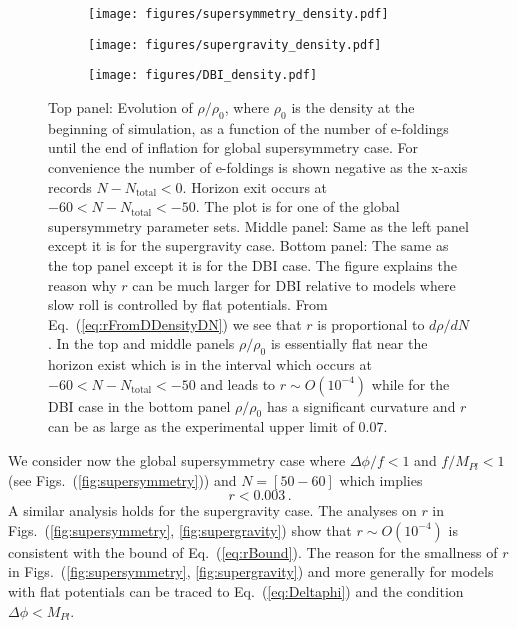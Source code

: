 \documentclass[12pt]{article}
\begin{document}
\begin{figure}
  \centering
  \begin{subfigure}{0.5 \textwidth}
    \texttt{[image: figures/supersymmetry\_density.pdf]}
  \end{subfigure}
  \begin{subfigure}{0.5 \textwidth}
    \texttt{[image: figures/supergravity\_density.pdf]}
  \end{subfigure}
  \begin{subfigure}{0.5 \textwidth}
    \texttt{[image: figures/DBI\_density.pdf]}
  \end{subfigure}
  \caption{
    Top panel: Evolution of $\rho / \rho_0$, where $\rho_0$ is the density at the beginning of simulation, as a function of the number of e-foldings until the end of inflation for global supersymmetry case.
    For convenience the number of e-foldings is shown negative as the x-axis records $N - N_\text{total} < 0$.
    Horizon exit occurs at $-60 < N - N_\text{total} < -50$.
    The plot is for one of the global supersymmetry parameter sets.
    Middle panel: Same as the left panel except it is for the supergravity case.
    Bottom panel: The same as the top panel except it is for the DBI case.
    The figure explains the reason why $r$ can be much larger for DBI relative to models where slow roll is controlled by flat potentials.
    From Eq.~(\ref{eq:rFromDDensityDN}) we see that $r$ is proportional to $d\rho / dN$.
    In the top and middle panels $\rho / \rho_0$ is essentially flat near the horizon exist which is in the interval which occurs at $-60 < N - N_\text{total} < -50$ and leads to $r \sim O\left(10^{-4}\right)$ while for the DBI case in the bottom panel $\rho / \rho_0$ has a significant curvature and $r$ can be as large as the experimental upper limit of $0.07$.} \label{fig:density}
\end{figure}
We consider now the global supersymmetry case where $\Delta\phi / f < 1$ and $f / M_{Pl} < 1$ (see Figs.~(\ref{fig:supersymmetry})) and $N = \left[50 - 60\right]$ which implies
\begin{equation} \label{eq:rBound}
  r < 0.003\,.
\end{equation}
A similar analysis holds for the supergravity case.
The analyses on $r$ in Figs.~(\ref{fig:supersymmetry}, \ref{fig:supergravity}) show that $r \sim O\left(10^{-4}\right)$ is consistent with the bound of Eq.~(\ref{eq:rBound}).
The reason for the smallness of $r$ in Figs.~(\ref{fig:supersymmetry}, \ref{fig:supergravity}) and more generally for models with flat potentials can be traced to Eq.~(\ref{eq:Deltaphi}) and the condition $\Delta\phi < M_{Pl}$.
\end{document}
